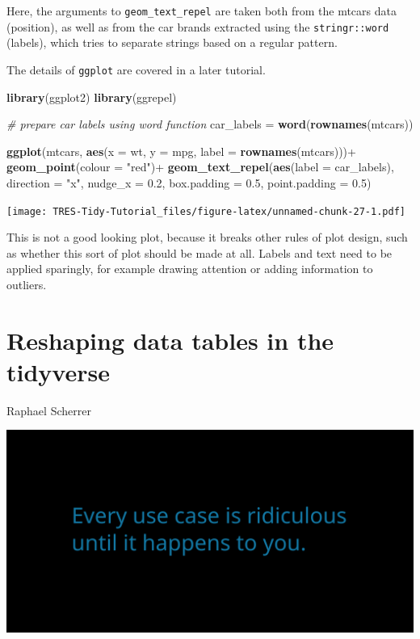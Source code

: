 \documentclass[]{book}
\newenvironment{Shaded}{}{}
\newcommand{\CommentTok}[1]{\textcolor[rgb]{0.38,0.63,0.69}{\textit{#1}}}
\newcommand{\DataTypeTok}[1]{\textcolor[rgb]{0.56,0.13,0.00}{#1}}
\newcommand{\FloatTok}[1]{\textcolor[rgb]{0.25,0.63,0.44}{#1}}
\newcommand{\KeywordTok}[1]{\textcolor[rgb]{0.00,0.44,0.13}{\textbf{#1}}}
\newcommand{\NormalTok}[1]{#1}
\newcommand{\OperatorTok}[1]{\textcolor[rgb]{0.40,0.40,0.40}{#1}}
\newcommand{\StringTok}[1]{\textcolor[rgb]{0.25,0.44,0.63}{#1}}
\begin{document}
Here, the arguments to \texttt{geom\_text\_repel} are taken both from the mtcars data (position), as well as from the car brands extracted using the \texttt{stringr::word} (labels), which tries to separate strings based on a regular pattern.

The details of \texttt{ggplot} are covered in a later tutorial.

\begin{Shaded}
\begin{Highlighting}[]
\KeywordTok{library}\NormalTok{(ggplot2)}
\KeywordTok{library}\NormalTok{(ggrepel)}

\CommentTok{# prepare car labels using word function}
\NormalTok{car_labels =}\StringTok{ }\KeywordTok{word}\NormalTok{(}\KeywordTok{rownames}\NormalTok{(mtcars))}

\KeywordTok{ggplot}\NormalTok{(mtcars,}
       \KeywordTok{aes}\NormalTok{(}\DataTypeTok{x =}\NormalTok{ wt, }\DataTypeTok{y =}\NormalTok{ mpg,}
           \DataTypeTok{label =} \KeywordTok{rownames}\NormalTok{(mtcars)))}\OperatorTok{+}
\StringTok{  }\KeywordTok{geom_point}\NormalTok{(}\DataTypeTok{colour =} \StringTok{"red"}\NormalTok{)}\OperatorTok{+}
\StringTok{  }\KeywordTok{geom_text_repel}\NormalTok{(}\KeywordTok{aes}\NormalTok{(}\DataTypeTok{label =}\NormalTok{ car_labels),}
                  \DataTypeTok{direction =} \StringTok{"x"}\NormalTok{,}
                  \DataTypeTok{nudge_x =} \FloatTok{0.2}\NormalTok{,}
                  \DataTypeTok{box.padding =} \FloatTok{0.5}\NormalTok{,}
                  \DataTypeTok{point.padding =} \FloatTok{0.5}\NormalTok{)}
\end{Highlighting}
\end{Shaded}

\texttt{[image: TRES-Tidy-Tutorial\_files/figure-latex/unnamed-chunk-27-1.pdf]}

This is not a good looking plot, because it breaks other rules of plot design, such as whether this sort of plot should be made at all. Labels and text need to be applied sparingly, for example drawing attention or adding information to outliers.

\hypertarget{reshaping-data-tables-in-the-tidyverse}{%
\chapter{Reshaping data tables in the tidyverse}\label{reshaping-data-tables-in-the-tidyverse}}

Raphael Scherrer

\includegraphics{opening-image.png}
\end{document}

